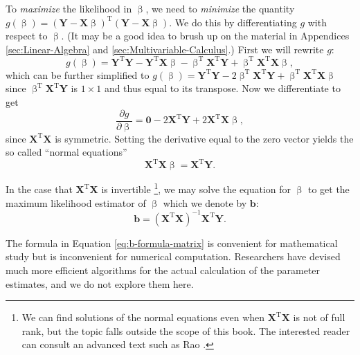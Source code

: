 \documentclass[captions=tableheading]{scrbook}
\begin{document}
To \emph{maximize} the likelihood in \(\upbeta\), we need to \emph{minimize} the quantity \(g(\upbeta)=\left(\mathbf{Y}-\mathbf{X}\upbeta\right)^{\mathrm{T}}\left(\mathbf{Y}-\mathbf{X}\upbeta\right)\). We do this by differentiating \(g\) with respect to \(\upbeta\). (It may be a good idea to brush up on the material in Appendices \ref{sec:Linear-Algebra} and \ref{sec:Multivariable-Calculus}.) First we will rewrite \(g\):
\begin{equation}
g(\upbeta)=\mathbf{Y}^{\mathrm{T}}\mathbf{Y}-\mathbf{Y}^{\mathrm{T}}\mathbf{X}\upbeta-\upbeta^{\mathrm{T}}\mathbf{X}^{\mathrm{T}}\mathbf{Y}+\upbeta^{\mathrm{T}}\mathbf{X}^{\mathrm{T}}\mathbf{X}\upbeta,
\end{equation}
which can be further simplified to \(g(\upbeta)=\mathbf{Y}^{\mathrm{T}}\mathbf{Y}-2\upbeta^{\mathrm{T}}\mathbf{X}^{\mathrm{T}}\mathbf{Y}+\upbeta^{\mathrm{T}}\mathbf{X}^{\mathrm{T}}\mathbf{X}\upbeta\) since \(\upbeta^{\mathrm{T}}\mathbf{X}^{\mathrm{T}}\mathbf{Y}\) is \(1\times1\) and thus equal to its transpose. Now we differentiate to get
\begin{equation}
\frac{\partial g}{\partial\upbeta}=\mathbf{0}-2\mathbf{X}^{\mathrm{T}}\mathbf{Y}+2\mathbf{X}^{\mathrm{T}}\mathbf{X}\upbeta,
\end{equation}
since \(\mathbf{X}^{\mathrm{T}}\mathbf{X}\) is symmetric. Setting the derivative equal to the zero vector yields the so called ``normal equations''
\begin{equation}
\mathbf{X}^{\mathrm{T}}\mathbf{X}\upbeta=\mathbf{X}^{\mathrm{T}}\mathbf{Y}.
\end{equation}

In the case that \(\mathbf{X}^{\mathrm{T}}\mathbf{X}\) is invertible
\footnote{We can find solutions of the normal equations even when \(\mathbf{X}^{\mathrm{T}}\mathbf{X}\) is not of full rank, but the topic falls outside the scope of this book. The interested reader can consult an advanced text such as Rao \cite{Rao1999}.},
we may solve the equation for \(\upbeta\) to get the maximum likelihood estimator of \(\upbeta\) which we denote by \(\mathbf{b}\):
\begin{equation}
\mathbf{b}=\left(\mathbf{X}^{\mathrm{T}}\mathbf{X}\right)^{-1}\mathbf{X}^{\mathrm{T}}\mathbf{Y}.\label{eq:b-formula-matrix}
\end{equation}

\begin{rem}
The formula in Equation \ref{eq:b-formula-matrix} is convenient for mathematical study but is inconvenient for numerical computation. Researchers have devised much more efficient algorithms for the actual calculation of the parameter estimates, and we do not explore them here.
\end{rem}
\end{document}
